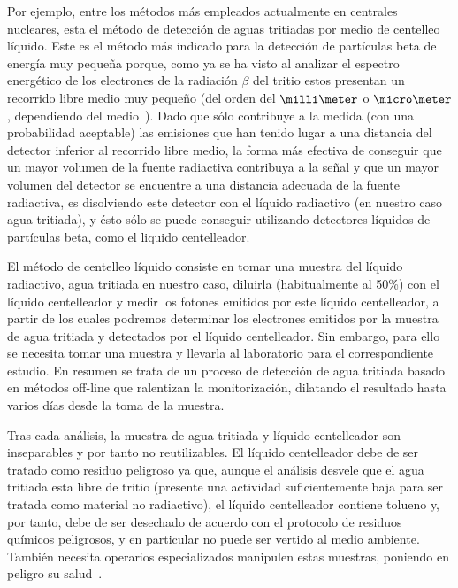 Por ejemplo, entre los métodos más empleados actualmente en centrales nucleares, esta el método de detección de aguas tritiadas por medio de centelleo líquido. Este es el método más indicado para la detección de partículas beta de energía muy pequeña porque, como ya se ha visto al analizar el espectro energético de los electrones de la radiación      $\beta$ del tritio estos presentan un recorrido libre medio muy pequeño (del orden del $\milli\meter$ o $\micro\meter$, dependiendo del medio~\cite{Isotopos}). Dado que sólo contribuye a la medida (con una probabilidad aceptable) las emisiones que han tenido lugar a una distancia del detector inferior al recorrido libre medio, la forma más efectiva de conseguir que un mayor volumen de la fuente radiactiva contribuya a la señal y que un mayor volumen del detector se encuentre a una distancia adecuada de la fuente radiactiva, es disolviendo este detector con el líquido radiactivo (en nuestro caso agua tritiada), y ésto sólo se puede conseguir utilizando detectores líquidos de partículas beta, como el liquido centelleador. 

El método de centelleo líquido consiste en tomar una muestra del líquido radiactivo, agua tritiada en nuestro caso, diluirla (habitualmente al 50\%) con el líquido centelleador y medir los fotones emitidos por este líquido centelleador, a partir de los cuales podremos determinar los electrones emitidos por la muestra de agua tritiada y detectados por el líquido centelleador. Sin embargo, para ello se necesita tomar una muestra y llevarla al laboratorio para el correspondiente estudio. En resumen se trata de un proceso de detección de agua tritiada basado en métodos off-line que ralentizan la monitorización, dilatando el resultado hasta varios días desde la toma de la muestra. 

Tras cada análisis, la muestra de agua tritiada y líquido centelleador son inseparables y por tanto no reutilizables.  El líquido centelleador debe de ser tratado como residuo peligroso ya que, aunque el análisis desvele que el agua tritiada esta libre de tritio (presente una actividad suficientemente baja para ser tratada como material no radiactivo), el líquido centelleador  contiene tolueno y, por tanto, debe de ser desechado de acuerdo con el protocolo de residuos químicos peligrosos, y en particular no puede ser vertido al medio ambiente. También necesita operarios especializados manipulen estas muestras, poniendo en peligro su salud~\cite{gel}.

